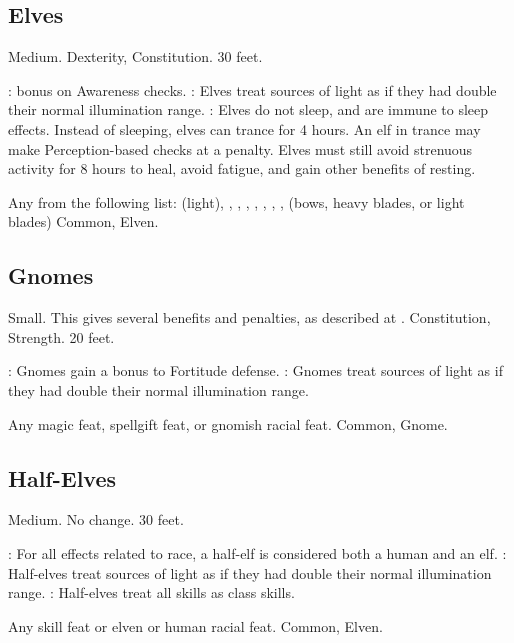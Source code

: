 \subsection{Elves}
 Medium.
  Dexterity,  Constitution.
 30 feet.
\begin{itemize}
    :  bonus on Awareness checks.
    : Elves treat sources of light as if they had double their normal illumination range.
    : Elves do not sleep, and are immune to sleep effects. Instead of sleeping, elves can trance for 4 hours. An elf in trance may make Perception-based checks at a  penalty. Elves must still avoid strenuous activity for 8 hours to heal, avoid fatigue, and gain other benefits of resting.
\end{itemize}
 Any from the following list:  (light), , , , , , , ,  (bows, heavy blades, or light blades)
 Common, Elven.

\subsection{Gnomes}
 Small. This gives several benefits and penalties, as described at .
  Constitution,  Strength.
 20 feet.
\begin{itemize}
    : Gnomes gain a  bonus to Fortitude defense.
    : Gnomes treat sources of light as if they had double their normal illumination range.
\end{itemize}
 Any magic feat, spellgift feat, or gnomish racial feat.
 Common, Gnome.

\subsection{Half-Elves}
 Medium.
 No change.
 30 feet.
\begin{itemize}
    : For all effects related to race, a half-elf is considered both a human and an elf.
    : Half-elves treat sources of light as if they had double their normal illumination range.
    : Half-elves treat all skills as class skills.
\end{itemize}
 Any skill feat or elven or human racial feat.
 Common, Elven.

